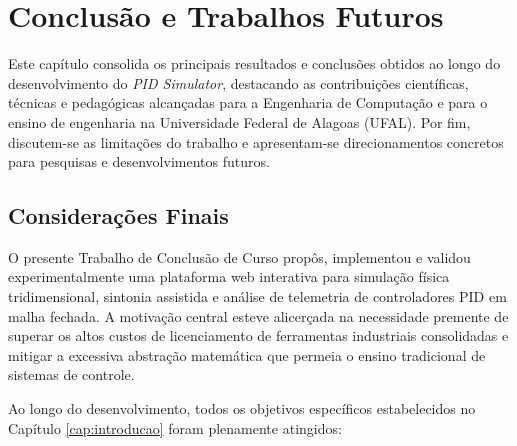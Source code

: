 \chapter{Conclusão e Trabalhos Futuros}
\label{cap:conclusao}

Este capítulo consolida os principais resultados e conclusões obtidos ao longo do desenvolvimento do \textit{PID Simulator}, destacando as contribuições científicas, técnicas e pedagógicas alcançadas para a Engenharia de Computação e para o ensino de engenharia na Universidade Federal de Alagoas (UFAL). Por fim, discutem-se as limitações do trabalho e apresentam-se direcionamentos concretos para pesquisas e desenvolvimentos futuros.

\section{Considerações Finais}
\label{sec:consideracoes_finais}

O presente Trabalho de Conclusão de Curso propôs, implementou e validou experimentalmente uma plataforma web interativa para simulação física tridimensional, sintonia assistida e análise de telemetria de controladores PID em malha fechada. A motivação central esteve alicerçada na necessidade premente de superar os altos custos de licenciamento de ferramentas industriais consolidadas e mitigar a excessiva abstração matemática que permeia o ensino tradicional de sistemas de controle.

Ao longo do desenvolvimento, todos os objetivos específicos estabelecidos no Capítulo \ref{cap:introducao} foram plenamente atingidos:

